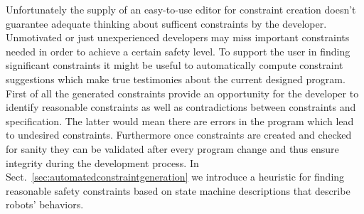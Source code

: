 \documentclass[conference]{IEEEtran}
\begin{document}
Unfortunately the supply of an easy-to-use editor for constraint creation doesn't guarantee adequate thinking about sufficent constraints by the developer. Unmotivated or just unexperienced developers may miss important constraints needed in order to achieve a certain safety level.
To support the user in finding significant constraints it might be useful to automatically compute constraint suggestions which make true testimonies about the current designed program. First of all the generated constraints provide an opportunity for the developer to identify reasonable constraints as well as contradictions between constraints and specification. The latter would mean there are errors in the program which lead to undesired constraints. Furthermore once constraints are created and checked for sanity they can be validated after every program change and thus ensure integrity during the development process. In Sect.~\ref{sec:automatedconstraintgeneration} we introduce a heuristic for finding reasonable safety constraints based on state machine descriptions that describe robots' behaviors.




\end{document}
